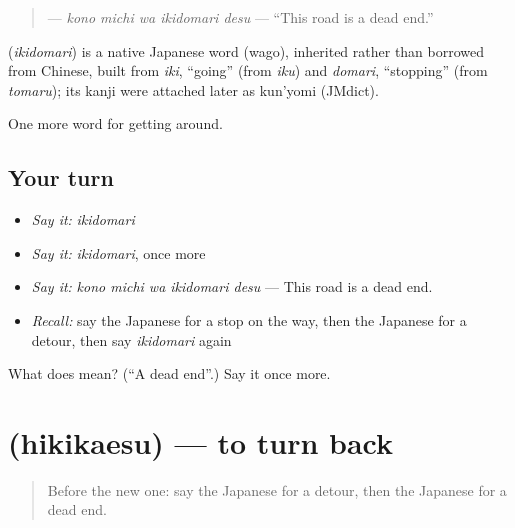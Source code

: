 \begin{quote}
\textbf{  } — \emph{kono michi wa ikidomari desu} — \textquotedblleft{}This road is a dead end.\textquotedblright{}
\end{quote}

\begin{cousinweb}
\textbf{} (\emph{ikidomari}) is a native Japanese word (wago), inherited rather than borrowed from Chinese, built from \emph{iki}, \textquotedblleft{}going\textquotedblright{} (from \emph{iku}) and \emph{domari}, \textquotedblleft{}stopping\textquotedblright{} (from \emph{tomaru}); its kanji were attached later as kun'yomi (JMdict).
\end{cousinweb}

\begin{grammarlens}[title={What you've built}]
One more word for getting around.
\end{grammarlens}

\subsection*{Your turn}
\begin{itemize}
\raggedright
  \item \emph{Say it:} \emph{ikidomari}
  \item \emph{Say it:} \emph{ikidomari}, once more
  \item \emph{Say it:} \emph{kono michi wa ikidomari desu} — This road is a dead end.
  \item \emph{Recall:} say the Japanese for a stop on the way, then the Japanese for a detour, then say \emph{ikidomari} again
\end{itemize}

\begin{tcolorbox}[breakable,colback=teal!4,colframe=teal!35!black,title={Before you move on}]
What does  mean? (\textquotedblleft{}A dead end\textquotedblright{}.) Say it once more.
\end{tcolorbox}
\section[\texorpdfstring{\ja{ひきかえす} (hikikaesu)}{ひきかえす (hikikaesu)}]{ (hikikaesu) — to turn back}

\label{lesson:JA-C392-hikikaesu}



\begin{quote}
Before the new one: say the Japanese for a detour, then the Japanese for a dead end.
\end{quote}

